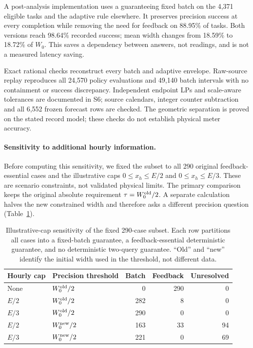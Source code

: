 \documentclass[12pt]{article}
\begin{document}
A post-analysis implementation uses a guaranteeing fixed batch on the
4,371 eligible tasks and the adaptive rule elsewhere. It preserves precision
success at every completion while removing the need for feedback on
88.95\% of tasks. Both versions reach 98.64\% recorded success; mean width
changes from 18.59\% to 18.72\% of $W_0$. This saves a dependency between
answers, not readings, and is not a measured latency saving.

Exact rational checks reconstruct every batch and adaptive envelope.
Raw-source replay reproduces all 24,570 policy evaluations and 49,140 batch
intervals with no containment or success discrepancy. Independent endpoint
LPs and scale-aware tolerances are documented in S6; source calendars,
integer counter subtraction and all 6,552 frozen forecast rows are checked.
The geometric separation is proved on the stated record model; these
checks do not establish physical meter accuracy.
\paragraph{Sensitivity to additional hourly information.}
Before computing this sensitivity, we fixed the subset to all 290
original feedback-essential cases and the illustrative caps
$0\leq x_h\leq E/2$ and $0\leq x_h\leq E/3$.
These are scenario constraints, not validated physical limits. The primary comparison
keeps the original absolute requirement $\tau=W_0^{\rm old}/2$.
A separate calculation halves the new constrained width and therefore
asks a different precision question (Table~\ref{tab:counter-caps}).

\begin{table}[htbp]\centering\small
\caption{Illustrative-cap sensitivity of the fixed 290-case subset.
Each row partitions all cases into a fixed-batch guarantee, a
feedback-essential deterministic guarantee, and no deterministic
two-query guarantee. ``Old'' and ``new'' identify the initial width used
in the threshold, not different data.}
\label{tab:counter-caps}
\begin{tabular}{llrrr}\toprule
Hourly cap & Precision threshold & Batch & Feedback & Unresolved\\\midrule
None & $W_0^{\rm old}/2$ & 0 & 290 & 0\\
$E/2$ & $W_0^{\rm old}/2$ & 282 & 8 & 0\\
$E/3$ & $W_0^{\rm old}/2$ & 290 & 0 & 0\\
$E/2$ & $W_0^{\rm new}/2$ & 163 & 33 & 94\\
$E/3$ & $W_0^{\rm new}/2$ & 221 & 0 & 69\\\bottomrule
\end{tabular}\end{table}
\end{document}
